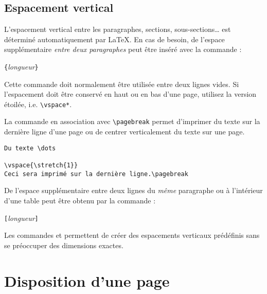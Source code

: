 \subsection{Espacement vertical}

L'espacement vertical entre les paragraphes, sections,
sous-sections\dots{} est déterminé automatiquement par \LaTeX{}. 
En cas de besoin, de l'espace supplémentaire 
\emph{entre deux paragraphes} peut être inséré avec la commande :
\begin{lscommand}
\verb|{|\emph{longueur}\verb|}|
\end{lscommand}

Cette commande doit normalement être utilisée entre deux lignes
vides. Si l'espacement doit être conservé en haut ou en bas d'une
page, utilisez la version étoilée, i.e. \verb|\vspace*|.

La commande  en association avec \verb|\pagebreak| permet
d'imprimer du texte sur la dernière ligne d'une page ou de centrer
verticalement du texte sur une page.
\begin{code}
\begin{verbatim}
Du texte \dots

\vspace{\stretch{1}}
Ceci sera imprimé sur la dernière ligne.\pagebreak
\end{verbatim}
\end{code}

De l'espace supplémentaire entre deux lignes du \emph{même} paragraphe
ou à l'intérieur d'une table peut être obtenu par la commande :
\begin{lscommand}
\ci{\bs}\verb|[|\emph{longueur}\verb|]|
\end{lscommand}

Les commandes  et  permettent de créer des
espacements verticaux prédéfinis sans se préoccuper des dimensions
exactes. 

\section{Disposition d'une page}

